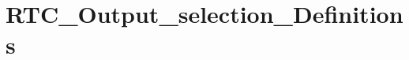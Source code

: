 \hypertarget{group___r_t_c___output__selection___definitions}{\section{R\-T\-C\-\_\-\-Output\-\_\-selection\-\_\-\-Definitions}
\label{group___r_t_c___output__selection___definitions}
}
